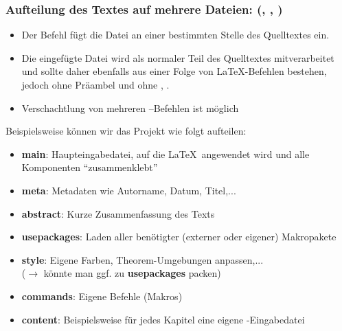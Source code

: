 \subsubsection{Aufteilung des Textes auf mehrere Dateien:  (, , )}
\begin{itemize}
	\item Der Befehl  fügt die Datei  an einer bestimmten Stelle des Quelltextes ein. 
	\item Die eingefügte Datei wird als normaler Teil des Quelltextes mitverarbeitet und sollte daher ebenfalls aus einer Folge von LaTeX-Befehlen bestehen, jedoch ohne Präambel und ohne , .
	\item Verschachtlung von mehreren --Befehlen ist möglich
\end{itemize}
Beispielsweise können wir das Projekt wie folgt aufteilen:
\begin{itemize}
	\item \textbf{main}: Haupteingabedatei, auf die \LaTeX~angewendet wird und alle Komponenten ``zusammenklebt''
	\item \textbf{meta}: Metadaten wie Autorname, Datum, Titel,...
	\item \textbf{abstract}: Kurze Zusammenfassung des Texts
	\item \textbf{usepackages}: Laden aller benötigter (externer oder eigener) Makropakete
	\item \textbf{style}: Eigene Farben, Theorem-Umgebungen anpassen,...\\
		($\to$ könnte man ggf. zu \textbf{usepackages} packen)
	\item \textbf{commands}: Eigene Befehle (Makros)
	\item \textbf{content}: Beispielsweise für jedes Kapitel eine eigene -Eingabedatei
\end{itemize}



